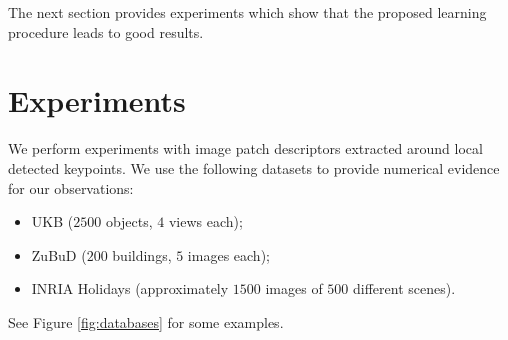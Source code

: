 \documentclass[10pt,conference,a4paper]{IEEEtran}
\begin{document}
		The next section provides experiments which show that the proposed learning procedure leads to good results.

	\section{Experiments}
		We perform experiments with image patch descriptors extracted around local detected keypoints.
		We use the following datasets to provide numerical evidence for our observations:
		\begin{itemize}
			\item
				UKB \cite{ukb} ($2500$ objects, $4$ views each);
			\item
				ZuBuD \cite{zubud} ($200$ buildings, $5$ images each);
			\item
				INRIA Holidays \cite{holidays}
				(approximately $1500$ images of $500$ different scenes).
		\end{itemize}
		See Figure \ref{fig:databases} for some examples.
\end{document}

